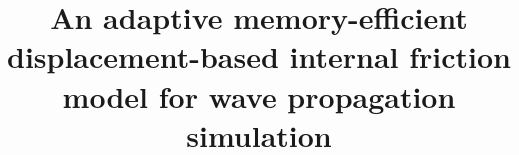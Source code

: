 
\title{%
	An adaptive memory-efficient displacement-based internal friction model for wave propagation simulation	
}
